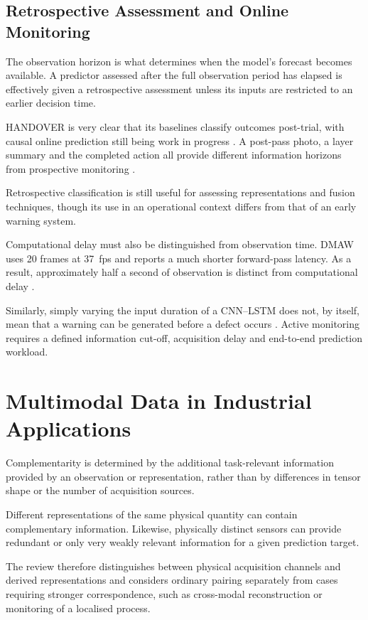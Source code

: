 \subsection{Retrospective Assessment and Online Monitoring}

The observation horizon is what determines when the model's forecast becomes available. A predictor
assessed after the full observation period has elapsed is effectively given a retrospective
assessment unless its inputs are restricted to an earlier decision time.

HANDOVER is very clear that its baselines classify outcomes post-trial, with causal online
prediction still being work in progress \citep[PDF p.~7 Section~VI]{Thoduka2024Handover}. A
post-pass photo, a layer summary and the completed action all provide different information horizons
from prospective monitoring \citep{P045,Petrich2021Multimodal}.

Retrospective classification is still useful for assessing representations and fusion techniques,
though its use in an operational context differs from that of an early warning system.

Computational delay must also be distinguished from observation time. DMAW uses 20 frames at 37~fps
and reports a much shorter forward-pass latency. As a result, approximately half a second of
observation is distinct from computational delay \citep[PDF pp.~6--7]{P003}.

Similarly, simply varying the input duration of a CNN--LSTM does not, by itself, mean that a warning
can be generated before a defect occurs \citep{Pandiyan2022Deep}. Active monitoring requires a
defined information cut-off, acquisition delay and end-to-end prediction workload.

\section{Multimodal Data in Industrial Applications}

Complementarity is determined by the additional task-relevant information provided by an observation
or representation, rather than by differences in tensor shape or the number of acquisition sources.

Different representations of the same physical quantity can contain complementary information.
Likewise, physically distinct sensors can provide redundant or only very weakly relevant information
for a given prediction target.

The review therefore distinguishes between physical acquisition channels and derived representations
and considers ordinary pairing separately from cases requiring stronger correspondence, such as
cross-modal reconstruction or monitoring of a localised process.

